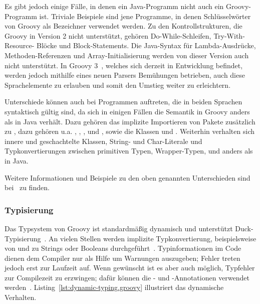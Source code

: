 Es gibt jedoch einige Fälle, in denen ein Java-Programm nicht auch ein Groovy-Programm ist.
Triviale Beispiele sind jene Programme, in denen Schlüsselwörter von Groovy als Bezeichner verwendet werden.
Zu den Kontrollstrukturen, die Groovy in Version 2 nicht unterstützt, gehören Do-While-Schleifen, Try-With-Resource- Blöcke und Block-Statements.
Die Java-Syntax für Lambda-Ausdrücke, Methoden-Referenzen und Array-Initialisierung werden von dieser Version auch nicht unterstützt.
In Groovy 3~\cite{groovy-lang:release3}, welches sich derzeit in Entwicklung befindet, werden jedoch mithilfe eines neuen Parsers Bemühungen betrieben, auch diese Sprachelemente zu erlauben und somit den Umstieg weiter zu erleichtern.

Unterschiede können auch bei Programmen auftreten, die in beiden Sprachen syntaktisch gültig sind, da sich in einigen Fällen die Semantik in Groovy anders als in Java verhält.
Dazu gehören das implizite Importieren von Pakete zusätzlich zu , dazu gehören {u.a.} , , ,  und , sowie die Klassen  und .
Weiterhin verhalten sich innere und geschachtelte Klassen, String- und Char-Literale und Typkonvertierungen zwischen primitiven Typen, Wrapper-Typen,  und  anders als in Java.

Weitere Informationen und Beispiele zu den oben genannten Unterschieden sind bei~\cite{groovy-lang:differences} zu finden.

\subsubsection{Typisierung}\label{subsubsec:typisierung}

Das Typsystem von Groovy ist standardmäßig dynamisch und unterstützt Duck-Typisierung~\cite[Abs.~6.]{groovy-lang:semantics}.
An vielen Stellen werden implizite Typkonvertierung, beispielsweise von und zu Strings oder Booleans durchgeführt~\cite[Abs.~3.]{groovy-lang:semantics}.
Typinformationen im Code dienen dem Compiler nur als Hilfe um Warnungen auszugeben; Fehler treten jedoch erst zur Laufzeit auf.
Wenn gewünscht ist es aber auch möglich, Typfehler zur Compilezeit zu erzwingen; dafür können die - und -Annotationen verwendet werden~\cite[Abs.~6.2.]{groovy-lang:semantics}.
Listing~\ref{lst:dynamic-typing.groovy} illustriert das dynamische Verhalten.

